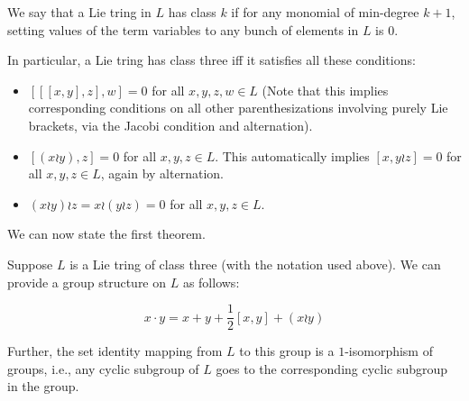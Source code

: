 \documentclass[10pt]{amsart}
\begin{document}
We say that a Lie tring in $L$ has class $k$ if for any monomial of
min-degree $k + 1$, setting values of the term variables to any bunch
of elements in $L$ is $0$.

In particular, a Lie tring has class three iff it satisfies all these
conditions:

\begin{itemize}
\item $[[[x,y],z],w] = 0$ for all $x,y,z,w \in L$ (Note that this
  implies corresponding conditions on all other parenthesizations
  involving purely Lie brackets, via the Jacobi condition and
  alternation).
\item $[(x \wr y),z] = 0$ for all $x,y,z \in L$. This automatically
  implies $[x,y \wr z] = 0$ for all $x,y,z \in L$, again by
  alternation.
\item $(x \wr y) \wr z = x \wr (y \wr z) = 0$ for all $x,y,z \in L$.
\end{itemize}

We can now state the first theorem.

\begin{theorem}
  Suppose $L$ is a Lie tring of class three (with the notation used
  above). We can provide a group structure on $L$ as follows:

  $$x \cdot y = x + y + \frac{1}{2}[x,y] + (x \wr y)$$

  Further, the set identity mapping from $L$ to this group is a
  $1$-isomorphism of groups, i.e., any cyclic subgroup of $L$ goes to
  the corresponding cyclic subgroup in the group.
\end{theorem}
\end{document}
